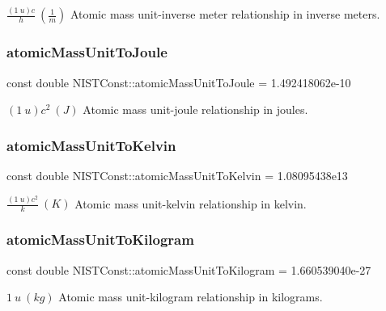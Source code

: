 $\frac{(1\ u)c}{h} \ (\frac{1}{m})$ Atomic mass unit-\/inverse meter relationship in inverse meters. \mbox{\label{group___atomic_mass_unit_gaea7c1916a35df8824ac6a67be3f65f33}} 
\subsubsection{\texorpdfstring{atomic\+Mass\+Unit\+To\+Joule}{atomicMassUnitToJoule}}
{\footnotesize\ttfamily const double N\+I\+S\+T\+Const\+::atomic\+Mass\+Unit\+To\+Joule = 1.\+492418062e-\/10}

$(1\ u)c^2 \ (J)$ Atomic mass unit-\/joule relationship in joules. \mbox{\label{group___atomic_mass_unit_gaf9c3a2dfd69d4e74cee3361abd7d7ecf}} 
\subsubsection{\texorpdfstring{atomic\+Mass\+Unit\+To\+Kelvin}{atomicMassUnitToKelvin}}
{\footnotesize\ttfamily const double N\+I\+S\+T\+Const\+::atomic\+Mass\+Unit\+To\+Kelvin = 1.\+08095438e13}

$\frac{(1\ u)c^2}{k} \ (K)$ Atomic mass unit-\/kelvin relationship in kelvin. \mbox{\label{group___atomic_mass_unit_gafdd40d93803d15e1ff887dc12c49ca99}} 
\subsubsection{\texorpdfstring{atomic\+Mass\+Unit\+To\+Kilogram}{atomicMassUnitToKilogram}}
{\footnotesize\ttfamily const double N\+I\+S\+T\+Const\+::atomic\+Mass\+Unit\+To\+Kilogram = 1.\+660539040e-\/27}

$1\ u\ (kg)$ Atomic mass unit-\/kilogram relationship in kilograms. 